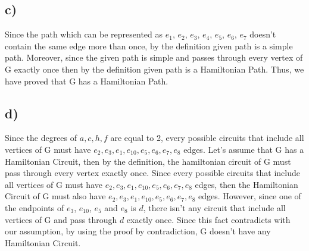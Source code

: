 \documentclass[11pt]{article}
\begin{document}
\subsection*{c)}
Since the path which can be represented as $e_{1}$, $e_{2}$, $e_{3}$, $e_{4}$, $e_{5}$, $e_{6}$, $e_{7}$ doesn't contain the same edge more than once, by the definition given path is a simple path. Moreover, since the given path is simple and passes through every vertex of G exactly once then by the definition given path is a Hamiltonian Path. Thus, we have proved that G has a Hamiltonian Path.
\subsection*{d)}
Since the degrees of $a,c,h,f$ are equal to 2, every possible circuits that include all vertices of G must have $e_{2},e_{3},e_{1},e_{10},e_{5},e_{6},e_{7},e_{8}$ edges. Let's assume that G has a Hamiltonian Circuit, then by the definition, the hamiltonian circuit of G must pass through every vertex exactly once. Since every possible circuits that include all vertices of G must have $e_{2},e_{3},e_{1},e_{10},e_{5},e_{6},e_{7},e_{8}$ edges, then the Hamiltonian Circuit of G must also have $e_{2},e_{3},e_{1},e_{10},e_{5},e_{6},e_{7},e_{8}$ edges. However, since one of the endpoints of $e_{3}$, $e_{10}$, $e_{5}$ and $e_{8}$ is $d$, there isn't any circuit that include all vertices of G and pass through $d$ exactly once. Since this fact contradicts with our assumption, by using the proof by contradiction, G doesn't have any Hamiltonian Circuit.
\end{document}
